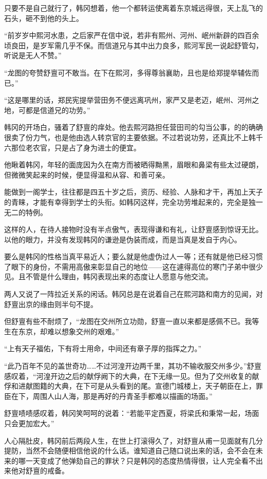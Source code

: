 只要不是自己就行了，韩冈想着，他一个都转运使离着东京城远得很，天上乱飞的石头，砸不到他的头上。

“前岁岁中熙河水患，之后家严在信中说，若非有熙州、河州、岷州新辟的四百余顷良田，是岁军需几乎不保。而信道兄与其中出力良多，熙河军民一说起舒管勾，听说是无人不赞。”

“龙图的夸赞舒亶可不敢当。在下在熙河，多得尊翁襄助，且也是给郑提举辅佐而已。”

“这是哪里的话，郑民宪提举营田务不便远离巩州，家严又是老迈，岷州、河州之地，可都是信道兄的功劳。”

韩冈的开场白，骚着了舒亶的痒处。他去熙河路担任营田司的勾当公事，的的确确很卖了份力气，也是他由选人转京官的主要依据。不过若说功劳，还真比不上韩千六那位老农官，只是占了身为进士的便宜。

他瞅着韩冈，年轻的面庞因为久在南方而被晒得黝黑，眉眼和鼻梁有些太过硬朗，但微微笑起来的时候，便显得温和从容、和善可亲。

能做到一阁学士，往往都是四五十岁之后，资历、经验、人脉和才干，再加上天子的青睐，才能有幸得到学士的头衔。如韩冈这样，完全功劳堆起来的，完全是独一无二的特例。

这样的人，在待人接物时没有半点傲气，表现得谦和有礼，让舒亶感到惊讶无比。以他的眼力，并没有发现韩冈的谦逊是伪装而成，而是当真是发自于内心。

要么是韩冈的性格当真平易近人；要么就是他虚伪过人一等；还有就是他已经习惯了眼下的身份，不需用高傲来彰显自己的地位——这在遽得高位的寒门子弟中很少见。且不管是什么理由，韩冈表现出来的态度让人愿意与他交流。

两人又说了一阵拉近关系的闲话。韩冈总是在说着自己在熙河路和南方的见闻，对舒亶出京的缘由则半句不提。

但舒亶有些不耐烦了，“龙图在交州所立功勋，舒亶一直以来都是感佩不已。我等生在东京，却难以想象交州的艰难。”

“上有天子福佑，下有将士用命，中间还有章子厚的指挥之力。”

“此乃百年不见的盖世奇功……不过河湟开边两千里，其功不输收服交州多少。”舒亶感叹着，“河湟开边之后的献俘阙下的大典，在下无缘一见。但为了交州收复的献俘和进献图籍的大典，在下可是从头看到的尾。宣德门城楼上，天子朝臣在上，罪臣在下，周围人山人海，那是再好的丹青圣手都难以描画的场面。”

舒亶啧啧感叹着，韩冈笑呵呵的说着：“若能平定西夏，将梁氏和秉常一起，场面只会更加宏大。”

人心隔肚皮，韩冈前后两段人生，在世上打滚得久了，对舒亶从甫一见面就有几分提防，当然不会随便相信他说的什么话。谁知道自己随口说出来的话，会不会在未来的哪一天变成了他弹劾自己的罪状？只是韩冈的态度热情得很，让人完全看不出来他对舒亶的戒备。

